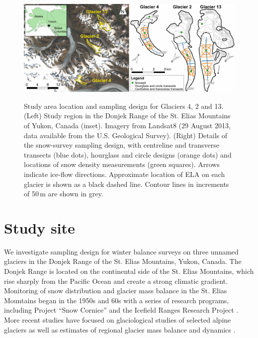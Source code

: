 \documentclass[twocolumn,letterpaper]{igs}
\begin{document}
\begin{figure}
	\centering
	\includegraphics[width =\textwidth]{PaperII-StudySite.pdf}\\
	\caption{Study area location and sampling design for Glaciers 4, 2 and 13. (Left) Study region in the Donjek Range of the St. Elias Mountains of Yukon, Canada (inset). Imagery from Landsat8 (29 August 2013, data available from the U.S. Geological Survey). (Right) Details of the snow-survey sampling design, with centreline and transverse transects (blue dots), hourglass and circle designs (orange dots) and locations of snow density measurements (green squares). Arrows indicate ice-flow directions. Approximate location of ELA on each glacier is shown as a black dashed line. Contour lines in increments of 50\,m are shown in grey.}
	\label{fig:Sampling}
\end{figure}

\section{Study site}

We investigate sampling design for winter balance surveys on three unnamed glaciers in the Donjek Range of the St. Elias Mountains, Yukon, Canada. The Donjek Range is located on the continental side of the St. Elias Mountains, which rise sharply from the Pacific Ocean and create a strong climatic gradient. Monitoring of snow distribution and glacier mass balance in the St. Elias Mountains began in the 1950s and 60s with a series of research programs, including Project ``Snow Cornice''  and the Icefield Ranges Research Project \citep{Wood1948, Danby2003}. More recent studies have focused on glaciological studies of selected alpine glaciers \citep[e.g.][]{Clarke2014} as well as estimates of regional glacier mass balance and dynamics \citep[e.g.][]{Arendt2008, Burgess2013,Waechter2015}. 
\end{document}
